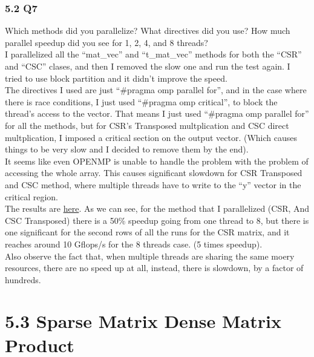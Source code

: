 \documentclass[]{article}
\begin{document}
    \subsubsection*{5.2 Q7}
    Which methods did you parallelize? What directives did you use? How much parallel speedup did you see for 1, 2, 4, and 8 threads?
    \\[1.1em]
    I parallelized all the ``mat\_vec'' and ``t\_mat\_vec'' methods for both the ``CSR'' and ``CSC'' clases, and then I removed the slow one and run the test again. I tried to use block partition and it didn't improve the speed. 
    \\
    The directives I used are just ``\#pragma omp parallel for'', and in the case where there is race conditions, I just used ``\#pragma omp critical'', to block the thread's access to the vector. That means I just used ``\#pragma omp parallel for'' for all the methods, but for CSR's Transposed multplication and CSC direct multplication, I imposed a critical section on the output vector. (Which causes things to be very slow and I decided to remove them by the end).
    \\
    It seems like even OPENMP is unable to handle the problem with the problem of accessing the whole array. This causes significant slowdown for CSR Transposed and CSC method, where multiple threads have to write to the ``y'' vector in the critical region. 
    \\
    The results are \hyperref[5.3.1.appendix]{here}. As we can see, for the method that I parallelized (CSR, And CSC Transposed) there is a 50\% speedup going from one thread to 8, but there is one significant for the second rows of all the runs for the CSR matrix, and it reaches around 10 Gflops/s for the 8 threads case. (5 times speedup).
    \\
    Also observe the fact that, when multiple threads are sharing the same moery resources, there are no speed up at all, instead, there is slowdown, by a factor of hundreds.
    

\section*{5.3 Sparse Matrix Dense Matrix Product}
\end{document}
